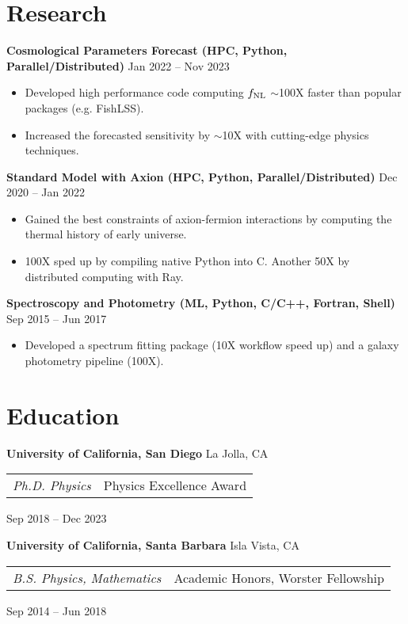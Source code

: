 \documentclass[letterpaper,12pt]{article}
\newenvironment{zitemize}{
\begin{itemize} \vspace{-.8em}\itemsep 0pt \parskip 0pt}
{\end{itemize}\vspace{-.7em}}
\newcommand{\proglang}[1]{#1}
\begin{document}
\section{Research}

\textbf{Cosmological Parameters Forecast (HPC, Python, Parallel/Distributed)} \hfill Jan 2022 -- Nov 2023 \\
\begin{zitemize}
    \item Developed high performance code computing $f_{\rm NL}$ $\sim$100X faster than popular packages (e.g. FishLSS).
    \item Increased the forecasted sensitivity by $\sim$10X with cutting-edge physics techniques.
\end{zitemize}

\textbf{Standard Model with Axion (HPC, Python, Parallel/Distributed)} \hfill Dec 2020 -- Jan 2022 \\
\begin{zitemize}
    \item Gained the best constraints of axion-fermion interactions by computing the thermal history of early universe.
    \item 100X sped up by compiling native \proglang{Python} into C. Another 50X by distributed computing with \proglang{Ray}.
\end{zitemize}

\textbf{Spectroscopy and Photometry (ML, Python, C/C++, Fortran, Shell)} \hfill Sep 2015 -- Jun 2017 \\
\begin{zitemize}
    \item Developed a spectrum fitting package (10X workflow speed up) and a galaxy photometry pipeline (100X).
\end{zitemize}


\section{Education}

\textbf{University of California, San Diego} \hfill La Jolla, CA \\
\begin{tabular}{p{12em} p{20em}}
    \textit{Ph.D. Physics} 
    & Physics Excellence Award 
\end{tabular}
\hfill Sep 2018 -- Dec 2023

\textbf{University of California, Santa Barbara} \hfill Isla Vista, CA \\
\begin{tabular}{p{12em} p{20em}}
    \textit{B.S. Physics, Mathematics}
    & Academic Honors, Worster Fellowship
\end{tabular}
\hfill Sep 2014 -- Jun 2018
\end{document}
